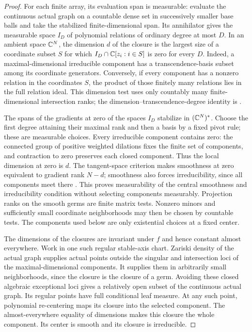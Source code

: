 \begin{proof}
For each finite array, its evaluation span is measurable: evaluate the
continuous actual graph on a countable dense set in successively smaller
base balls and take the stabilized finite-dimensional span. Its
annihilator gives the measurable space $I_D$ of polynomial relations of
ordinary degree at most $D$. In an ambient space $\mathbb C^N$, the dimension
$d$ of the closure is the largest size of a coordinate subset $S$ for
which $I_D\cap\mathbb C[z_i:i\in S]$ is zero for every $D$. Indeed, a
maximal-dimensional irreducible component has a transcendence-basis
subset among its coordinate generators. Conversely, if every component
has a nonzero relation in the coordinates $S$, the product of those
finitely many relations lies in the full relation ideal. This dimension
test uses only countably many finite-dimensional intersection ranks;
the dimension--transcendence-degree identity is
\citet[Tag~00P0]{StacksProject}.

The spans of the gradients at zero of the spaces $I_D$ stabilize in
$(\mathbb C^N)^*$. Choose the first degree attaining their maximal rank and
then a basis by a fixed pivot rule; these are measurable choices.
Every irreducible component contains zero: the connected
group of positive weighted dilations fixes the finite set of components,
and contraction to zero preserves each closed component. Thus the local
dimension at zero is $d$. The tangent-space criterion makes smoothness
at zero equivalent to gradient rank $N-d$; smoothness also forces
irreducibility, since all components meet there
\citep[Tags~00KU, 0B8X, and~00NP]{StacksProject}.
This proves measurability of the central smoothness and irreducibility
condition without selecting components measurably. Projection ranks on
the smooth germs are finite matrix tests. Nonzero minors and sufficiently
small coordinate neighborhoods may then be chosen by countable tests.
The components used below are only existential choices at a fixed
center.

The dimensions of the closures are invariant under $f$ and hence
constant almost everywhere. Work in one such regular stable-axis chart.
Zariski density of the actual graph supplies actual points outside the
singular and intersection loci of the maximal-dimensional components.
It supplies them in arbitrarily small neighborhoods, since the closure
is the closure of a germ. Avoiding these closed algebraic exceptional
loci gives a relatively open subset of the continuous actual graph.
Its regular points have full conditional leaf measure. At any such
point, polynomial re-centering maps its closure into the selected
component. The almost-everywhere equality of dimensions makes this
closure the whole component. Its center is smooth and its closure is
irreducible.


\end{proof}
